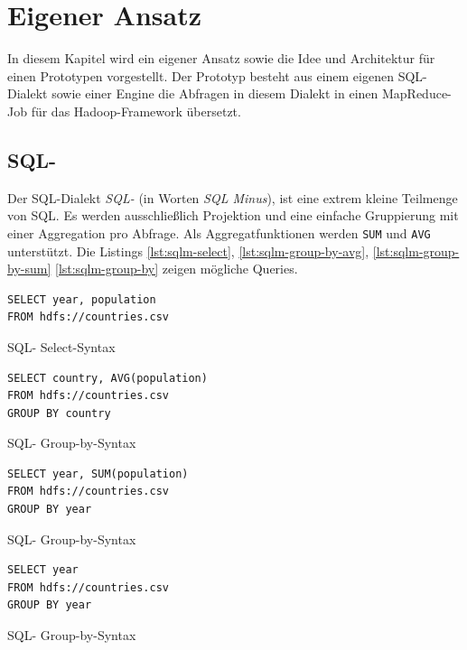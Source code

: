 \documentclass[a4paper]{article}
\begin{document}
\newpage
\section{Eigener Ansatz}
In diesem Kapitel wird ein eigener Ansatz sowie die Idee und Architektur für einen Prototypen vorgestellt. Der Prototyp besteht aus einem eigenen SQL-Dialekt sowie einer Engine die Abfragen in diesem Dialekt in einen MapReduce-Job für das Hadoop-Framework übersetzt.

\subsection{SQL-}
Der SQL-Dialekt \textit{SQL-} (in Worten \textit{SQL Minus}), ist eine extrem kleine Teilmenge von SQL. Es werden ausschließlich Projektion und eine einfache Gruppierung mit einer Aggregation pro Abfrage. Als Aggregatfunktionen werden \texttt{SUM} und \texttt{AVG} unterstützt. Die Listings \ref{lst:sqlm-select}, \ref{lst:sqlm-group-by-avg}, \ref{lst:sqlm-group-by-sum} \ref{lst:sqlm-group-by} zeigen mögliche Queries. 

\begin{listing}[H]
\begin{verbatim}
SELECT year, population
FROM hdfs://countries.csv
\end{verbatim}
\caption{SQL- Select-Syntax}
\label{lst:sqlm-select}
\end{listing}

\begin{listing}[H]
\begin{verbatim}
SELECT country, AVG(population)
FROM hdfs://countries.csv
GROUP BY country
\end{verbatim}
\caption{SQL- Group-by-Syntax}
\label{lst:sqlm-group-by-avg}
\end{listing}

\begin{listing}[H]
\begin{verbatim}
SELECT year, SUM(population)
FROM hdfs://countries.csv
GROUP BY year
\end{verbatim}
\caption{SQL- Group-by-Syntax}
\label{lst:sqlm-group-by-sum}
\end{listing}

\begin{listing}[H]
\begin{verbatim}
SELECT year
FROM hdfs://countries.csv
GROUP BY year
\end{verbatim}
\caption{SQL- Group-by-Syntax}
\label{lst:sqlm-group-by}
\end{listing}
\end{document}
